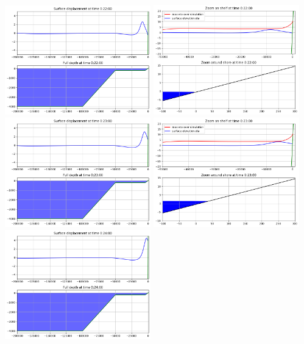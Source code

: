 \documentclass[11pt]{article}
\begin{document}
\vskip 10pt 
\includegraphics[width=0.475\textwidth]{frame0022fig0.png}
\includegraphics[width=0.475\textwidth]{frame0022fig1.png}
\vskip 10pt 
\includegraphics[width=0.475\textwidth]{frame0023fig0.png}
\includegraphics[width=0.475\textwidth]{frame0023fig1.png}
\vskip 10pt 
\includegraphics[width=0.475\textwidth]{frame0024fig0.png}
\end{document}
